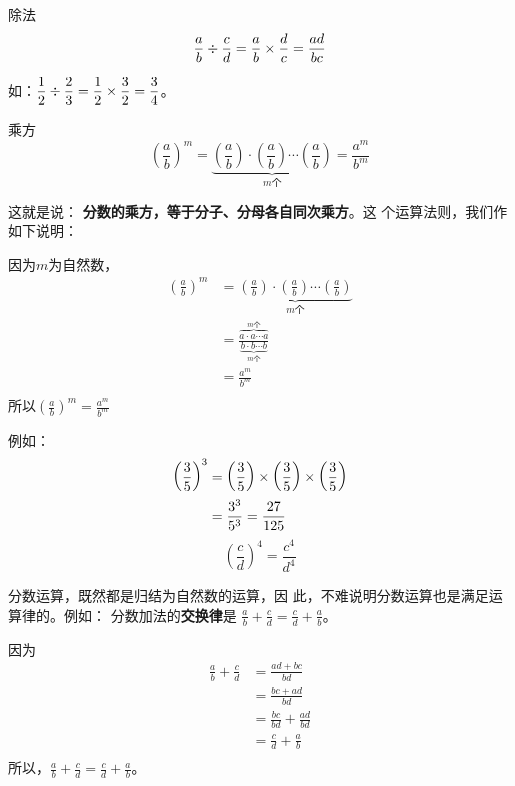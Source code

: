 \begin{blk}{除法}
	\[\dfrac{a}{b}\div \dfrac{c}{d}=\dfrac{a}{b}\times\dfrac{d}{c}=\dfrac{ad}{bc}\]
\end{blk}

如：$\dfrac{1}{2}\div\dfrac{2}{3}=\dfrac{1}{2}\times \dfrac{3}{2}=\dfrac{3}{4}$。

\begin{blk}{乘方}
	\[\left(\frac{a}{b}\right)^m=\underbrace{\left(\frac{a}{b}\right)\cdot \left(\frac{a}{b}\right)\cdots \left(\frac{a}{b}\right)}_{\text{$m$个}}=\frac{a^m}{b^m}\]
\end{blk}

这就是说：
\textbf{分数的乘方，等于分子、分母各自同次乘方}。这
个运算法则，我们作如下说明：

\begin{note}
	因为$m$为自然数，
	\begin{align*}
	\left(\frac{a}{b}\right)^m&=\underbrace{\left(\frac{a}{b}\right)\cdot \left(\frac{a}{b}\right)\cdots \left(\frac{a}{b}\right)}_{\text{$m$个}}
	\tag{乘方的意义}\\
	&=\frac{\overbrace{a\cdot a\cdots a}^{\text{$m$个}}}{\underbrace{b\cdot b\cdots b}_{\text{$m$个}}} \tag{分数乘法法则}\\
	&= \frac{a^m}{b^m}\tag{乘方的意义}\\
	\end{align*}
	所以$\left(\frac{a}{b}\right)^m=\frac{a^m}{b^m}$
\end{note}

例如：
\[ \begin{split}
\left(\dfrac{3}{5}\right)^3&=\left(\dfrac{3}{5}\right)\times \left(\dfrac{3}{5}\right)\times \left(\dfrac{3}{5}\right)\\
&=\dfrac{3^3}{5^3}=\dfrac{27}{125}
\end{split} \]
\[ \left(\frac{c}{d}\right)^4=\frac{c^4}{d^4} \]

分数运算，既然都是归结为自然数的运算，因
此，不难说明分数运算也是满足运算律的。例如：
分数加法的\textbf{交换律}是
$\frac{a}{b}+\frac{c}{d}=\frac{c}{d}+\frac{a}{b}$。

\begin{note}
	因为
	\begin{align*}
	\frac{a}{b}+\frac{c}{d}&=\frac{ad+bc}{bd} \tag{分数加法法则}\\
	&=\frac{bc+ad}{bd}\tag{自然数加法交换律}\\
	&=\frac{bc}{bd}+\frac{ad}{bd}\\
	&=\frac{c}{d}+\frac{a}{b}\tag{分数的基本性质}\\
	\end{align*}
	所以，$\frac{a}{b}+\frac{c}{d}=\frac{c}{d}+\frac{a}{b}$。
\end{note}

